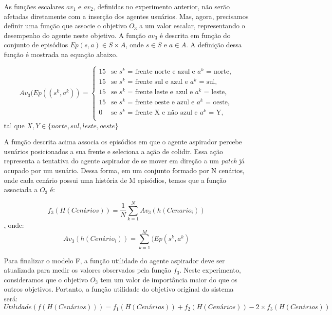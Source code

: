 As funções escalares $av_1$ e $av_2$, definidas no experimento anterior, não serão afetadas diretamente com a inserção dos agentes usuários. Mas, agora, precisamos definir uma função que associe o objetivo $O_3$ a um valor escalar, representando o desempenho do agente neste objetivo. A função $av_3$ é descrita em função do conjunto de episódios $Ep(s, a) \in S\times A$, onde $s \in S$ e $a \in A$. A definição dessa função é mostrada na equação abaixo. 

\[
Av_3(Ep((s^k, a^k)) =
\begin{cases}
  15 & \text{se $s^k$ = frente norte e azul e $a^k$ = norte,}\\
  15 & \text{se $s^k$ = frente sul e azul e $a^k$ = sul,}\\
  15 & \text{se $s^k$ = frente leste e azul e $a^k$ = leste,}\\
  15 & \text{se $s^k$ = frente oeste e azul e $a^k$ = oeste,}\\
  0 & \text{se $s^k$ = frente X e não azul e $a^k$ = Y,}\\
\end{cases}
\]
 tal que $X, Y \in \{ norte, sul, leste, oeste\}$ 

A função descrita acima associa os episódios em que o agente aspirador percebe usuários posicionados a sua frente e seleciona a ação de colidir. Essa ação representa a tentativa do agente aspirador de se mover em direção a um \textit{patch} já ocupado por um usuário. Dessa forma, em um conjunto formado por N cenários, onde cada cenário possui uma história de M episódios, temos que a função associada a $O_3$ é:

\begin{equation}
    f_3(H(Cenários)) = \frac{1}{N}\sum_{k=1}^{N}Av_3(h(Cenario_i))
\end{equation}
, onde:
\begin{equation}
    Av_3(h(Cenário_i)) = \sum_{k=1}^{M}(Ep(s^k, a^k)
\end{equation}

Para finalizar o modelo F, a função utilidade do agente aspirador deve ser atualizada para medir os valores observados pela função $f_3$. Neste experimento, consideramos que o objetivo $O_3$ tem um valor de importância maior do que os outros objetivos. Portanto, a função utilidade do objetivo original do sistema será:
\begin{equation}
    Utilidade(f (H(Cenários)))= f_1 (H(Cenários)) + f_2 (H(Cenários)) - 2 \times f_3 (H(Cenários))
\end{equation}

